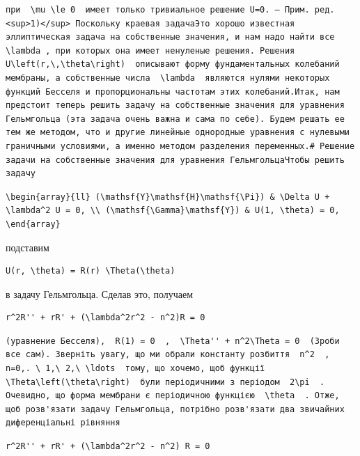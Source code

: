 \documentclass[
  ukrainian,
]{article}
\begin{document}
\begin{verbatim}
при  \mu \le 0  имеет только тривиальное решение U=0. — Прим. ред.<sup>1)</sup> Поскольку краевая задачаЭто хорошо известная эллиптическая задача на собственные значения, и нам надо найти все  \lambda , при которых она имеет ненуленые решения. Решения  U\left(r,\,\theta\right)  описывают форму фундаментальных колебаний мембраны, а собственные числа  \lambda  являются нулями некоторых функций Бесселя и пропорциональны частотам этих колебаний.Итак, нам предстоит теперь решить задачу на собственные значения для уравнения Гельмгольца (эта задача очень важна и сама по себе). Будем решать ее тем же методом, что и другие линейные однородные уравнения с нулевыми граничными условиями, а именно методом разделения переменных.# Решение задачи на собственные значения для уравнения ГельмгольцаЧтобы решить задачу
\end{verbatim}

\begin{verbatim}
\begin{array}{ll} (\mathsf{Y}\mathsf{H}\mathsf{\Pi}) & \Delta U + \lambda^2 U = 0, \\ (\mathsf{\Gamma}\mathsf{Y}) & U(1, \theta) = 0, \end{array}
\end{verbatim}

подставим

\begin{verbatim}
U(r, \theta) = R(r) \Theta(\theta)
\end{verbatim}

в задачу Гельмгольца. Сделав это, получаем

\begin{verbatim}
r^2R'' + rR' + (\lambda^2r^2 - n^2)R = 0
\end{verbatim}

\begin{verbatim}
(уравнение Бесселя),  R(1) = 0  ,  \Theta'' + n^2\Theta = 0  (Зроби все сам). Зверніть увагу, що ми обрали константу розбиття  n^2  ,  n=0,. \ 1,\ 2,\ \ldots  тому, що хочемо, щоб функції  \Theta\left(\theta\right)  були періодичними з періодом  2\pi  . Очевидно, що форма мембрани є періодичною функцією  \theta  . Отже, щоб розв'язати задачу Гельмгольца, потрібно розв'язати два звичайних диференціальні рівняння
\end{verbatim}

\begin{verbatim}
r^2R'' + rR' + (\lambda^2r^2 - n^2) R = 0
\end{verbatim}
\end{document}
